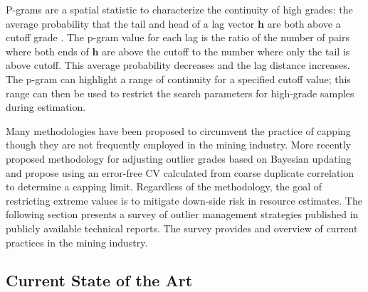 P-grams are a spatial statistic to characterize the continuity of high grades: the average probability that the tail and head of a lag vector $\mathbf{h}$ are both above a cutoff grade \citep{leuangthong2015dealing, nowak2019optimal}. The p-gram value for each lag is the ratio of the number of pairs where both ends of $\mathbf{h}$ are above the cutoff to the number where only the tail is above cutoff. This average probability decreases and the lag distance increases. The p-gram can highlight a range of continuity for a specified cutoff value; this range can then be used to restrict the search parameters for high-grade samples during estimation.

Many methodologies have been proposed to circumvent the practice of capping \citep{rivoirard2013topcut, fourie2019limiting,maleki2014capping,costa2003reducing,hawkins1984robust,machado2012field,journel1983nonparametric,parker1991statistical} though they are not frequently employed in the mining industry. More recently \cite{silva2021classification} proposed methodology for adjusting outlier grades based on Bayesian updating and \cite{dutaut2021new} propose using an error-free \gls{CV} calculated from coarse duplicate correlation to determine a capping limit. Regardless of the methodology, the goal of restricting extreme values is to mitigate down-side risk in resource estimates. The following section presents a survey of outlier management strategies published in publicly available technical reports. The survey provides and overview of current practices in the mining industry.



\FloatBarrier
\subsection{Current State of the Art}
\label{subsec:02state}

